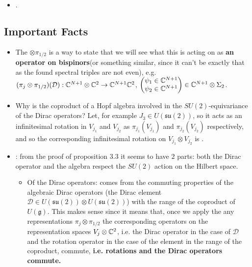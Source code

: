 \documentclass{article}
\newcommand{\alg}[1]{\ensuremath{\mathfrak{#1}}}
\newcommand{\sut}{\ensuremath{\mathfrak{su}(2)}}
\begin{document}
\begin{itemize}
\begin{itemize}
        \item {}.
            
        \end{itemize}
    
    
    \end{itemize}

\subsection{Important Facts}

    \begin{itemize}

    \item The $\otimes \pi_{1/2}$ is a way to state that we will see what this is acting on as \textbf{an operator on bispinors}(or something similar, since it can't be exactly that as the found spectral triples are not even), e.g. $(\pi_j \otimes \pi_{1/2})(\mathcal D): \mathbb{C}^{N+1}\otimes \mathbb{C}^2 \to \mathbb{C}^{N+1}\mathbb{C}^2$, $\begin{pmatrix} \psi_1 \in \mathbb{C}^{N+1} \\ \psi_2 \in \mathbb{C}^{N+1} \end{pmatrix} \in \mathbb{C}^{N+1}\otimes \Sigma_2$.
    
    \item Why is the coproduct of a Hopf algebra involved in the $SU(2)$-equivariance of the Dirac operators? Let, for example $J_3 \in U(\sut)$, so it acts as an infinitesimal rotation in $V_{j_1}$ and $V_{j_2}$ as $\pi_{j_1}(V_{j_1})$ and $\pi_{j_2}(V_{j_2})$ respectively, and so the corresponding infinitesimal rotation on $V_{j_1}\otimes V_{j_2}$ is .
    
    \item {}: from the proof of proposition 3.3 it seems to have $2$ parts: both the Dirac operator and the algebra respect the $SU(2)$ action on the Hilbert space.
    
        \begin{itemize}
            
        \item Of the Dirac operators: comes from the commuting properties of the algebraic Dirac operators (the Dirac element $\mathcal D \in U(\sut) \otimes U(\sut)$) with the range of the coproduct of $U(\alg g)$. This makes sense since it means that, once we apply the any representations $\pi_j \otimes \pi_{1/2}$ the corresponding operators on the representation spaces $V_j \otimes \mathbb{C}^2$, i.e. the Dirac operator in the case of $\mathcal D$ and the rotation operator in the case of the element in the range of the coproduct, commute, \textbf{i.e. rotations and the Dirac operators commute.}
            

\end{itemize}
\end{itemize}
\end{document}
